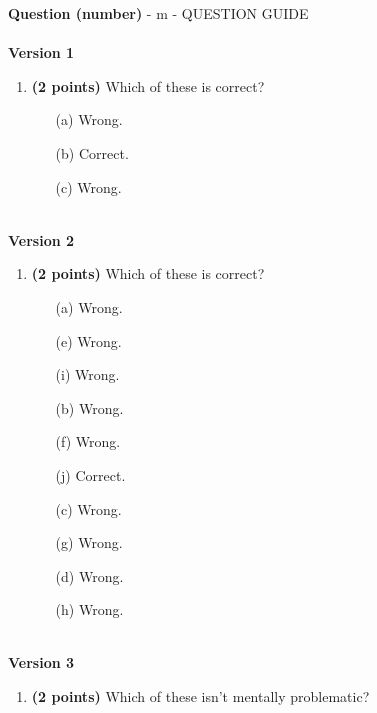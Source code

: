 \documentclass[12pt]{amsart}
\begin{document}
\graphicspath{{C:/Users/iainc/anaconda3/Randomizer/Sample Course/Sample Assessment/}}{\Large{\bf Question (number)}} - m - QUESTION GUIDE \\$ $ \\ {\bf Version 1} \\\begin{enumerate}[resume]
\item {\bf (2 points)} 
 Which of these is correct?

\begin{minipage}[t]{1.0\linewidth}\begin{multicols}{3}\begin{itemize}\item[(a)]  Wrong. \item[(b)]  Correct. \item[(c)]  Wrong. \end{itemize}\end{multicols}\end{minipage} \vfill \end{enumerate}$ $ \\ {\bf Version 2} \\\begin{enumerate}[resume]
\item {\bf (2 points)} 
 Which of these is correct?

\begin{minipage}[t]{1.0\linewidth}\begin{multicols}{4}\begin{itemize}\item[(a)]  Wrong. \item[(e)]  Wrong. \item[(i)]  Wrong. \item[(b)]  Wrong. \item[(f)]  Wrong. \item[(j)]  Correct. \item[(c)]  Wrong. \item[(g)]  Wrong. \item[] \item[(d)]  Wrong. \item[(h)]  Wrong. \item[] \end{itemize}\end{multicols}\end{minipage} \vfill \end{enumerate}$ $ \\ {\bf Version 3} \\\begin{enumerate}[resume]
\item {\bf (2 points)} 
 Which of these isn't mentally problematic?


\end{enumerate}
\end{document}
